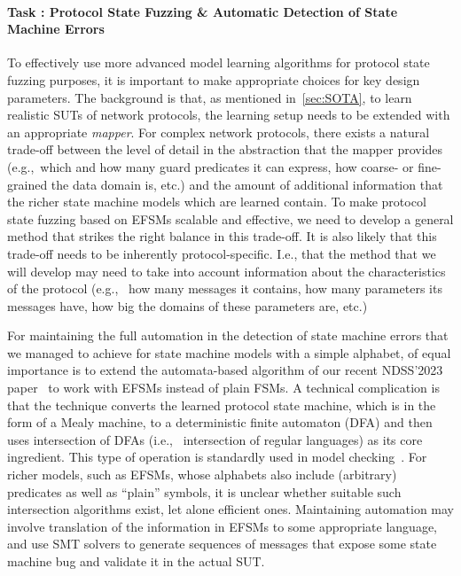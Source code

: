 \documentclass[11pt]{article}
\newcounter{Task}
\newcommand{\task}[1]{\addtocounter{Task}{1}\paragraph{Task \theTask: #1}}
\newcommand{\myparagraph}{}
\let\myparagraph=\paragraph
\renewcommand{\paragraph}{\vspace{-3mm}\myparagraph}
\newcommand{\eg}{e.\/g.,\ }
\newcommand{\ie}{i.\/e.,\ }
\begin{document}
\task{Protocol State Fuzzing \& Automatic Detection of State Machine Errors}
To effectively use more advanced model learning algorithms for protocol
state fuzzing purposes, it is important to make appropriate choices for key design parameters.
The background is that, as mentioned in~\cref{sec:SOTA}, to learn realistic SUTs of network protocols,
the learning setup needs to be extended with an appropriate \emph{mapper}.
For complex network protocols, there exists a natural trade-off between the
level of detail in the abstraction that the mapper provides (\eg which and how
many guard predicates it can express, how coarse- or fine-grained the data
domain is, etc.) and the amount of additional information that the richer
state machine models which are learned contain.  To make protocol state
fuzzing based on EFSMs scalable and effective,
we need to develop a general method that strikes the right balance in this
trade-off.
%
It is also likely that this trade-off needs to be inherently
protocol-specific.  I.e., that the method that we will develop may need to
take into account information about the characteristics of the protocol (\eg
how many messages it contains, how many parameters its messages have, how big
the domains of these parameters are, etc.)

For maintaining the full automation in the detection of state machine errors
that we managed to achieve for state machine models with a simple alphabet, of
equal importance is to extend the automata-based algorithm of our recent
NDSS'2023 paper~\cite{AutomataBased@NDSS-23} to work with EFSMs instead of
plain FSMs.  A technical complication is that the technique converts the
learned protocol state machine, which is in the form of a Mealy machine, to a
deterministic finite automaton (DFA) and then uses intersection of DFAs (\ie
intersection of regular languages) as its core ingredient. This type of operation is
standardly used in model checking~\cite{MC:handbook}.
For richer models, such as EFSMs, whose alphabets also include (arbitrary)
predicates as well as ``plain'' symbols, it is unclear whether suitable such
intersection algorithms exist, let alone efficient ones.  Maintaining
automation may involve translation of the information in EFSMs to some
appropriate language, and use SMT solvers to generate sequences of messages
that expose some state machine bug and validate it in the actual SUT.
\end{document}
